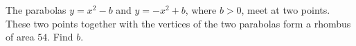 The parabolas $y=x^2-b$ and $y=-x^2+b$, where $b>0$, meet at two points. These two points together with the vertices of the two parabolas form a rhombus of area $54$. Find $b$.
